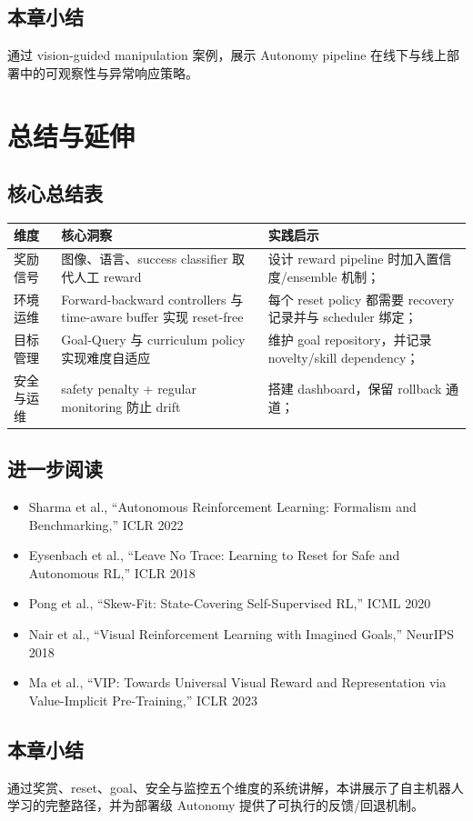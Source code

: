 \documentclass[a4paper]{article}
\begin{document}
\subsection{本章小结}
通过 vision-guided manipulation 案例，展示 Autonomy pipeline 在线下与线上部署中的可观察性与异常响应策略。
\newpage

\section{总结与延伸}
\subsection{核心总结表}
\begin{tabularx}{\textwidth}{lXl}
\toprule
维度 & 核心洞察 & 实践启示 \\
\midrule
奖励信号 & 图像、语言、success classifier 取代人工 reward & 设计 reward pipeline 时加入置信度/ensemble 机制； \\
环境运维 & Forward-backward controllers 与 time-aware buffer 实现 reset-free & 每个 reset policy 都需要 recovery 记录并与 scheduler 绑定； \\
目标管理 & Goal-Query 与 curriculum policy 实现难度自适应 & 维护 goal repository，并记录 novelty/skill dependency； \\
安全与运维 & safety penalty + regular monitoring 防止 drift & 搭建 dashboard，保留 rollback 通道； \\
\bottomrule
\end{tabularx}

\subsection{进一步阅读}
\begin{itemize}
\item Sharma et al., ``Autonomous Reinforcement Learning: Formalism and Benchmarking,'' ICLR 2022
\item Eysenbach et al., ``Leave No Trace: Learning to Reset for Safe and Autonomous RL,'' ICLR 2018
\item Pong et al., ``Skew-Fit: State-Covering Self-Supervised RL,'' ICML 2020
\item Nair et al., ``Visual Reinforcement Learning with Imagined Goals,'' NeurIPS 2018
\item Ma et al., ``VIP: Towards Universal Visual Reward and Representation via Value-Implicit Pre-Training,'' ICLR 2023
\end{itemize}

\subsection{本章小结}
通过奖赏、reset、goal、安全与监控五个维度的系统讲解，本讲展示了自主机器人学习的完整路径，并为部署级 Autonomy 提供了可执行的反馈/回退机制。
\end{document}
